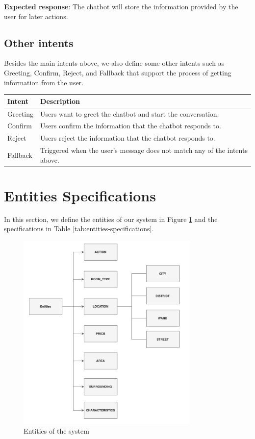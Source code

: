 \noindent \textbf{Expected response}: The chatbot will store the information provided by the user for later actions.

\subsection{Other intents}
Besides the main intents above, we also define some other intents such as Greeting, Confirm, Reject, and Fallback that support the process of getting information from the user. 

{\renewcommand{\arraystretch}{1.75}%
\begin{table}[ht]
    \centering
    \begin{tabular}{|l|l|}
        \hline
        \textbf{Intent} & \textbf{Description} \\ \hline
        Greeting & Users want to greet the chatbot and start the conversation. \\ \hline
        Confirm & Users confirm the information that the chatbot responds to. \\ \hline
        Reject & Users reject the information that the chatbot responds to. \\ \hline
        Fallback & Triggered when the user's message does not match any of the intents above.  \\ \hline
    \end{tabular}
\end{table}}

\section{Entities Specifications}
In this section, we define the entities of our system in Figure \ref{fig:entities} and the specifications in Table \ref{tab:entities-specifications}.

\begin{figure}[ht]
    \centering
    \includegraphics[width=0.8\textwidth]{Images/7.System_Modeling/entities.png}
    \caption{Entities of the system}
    \label{fig:entities}
\end{figure}


